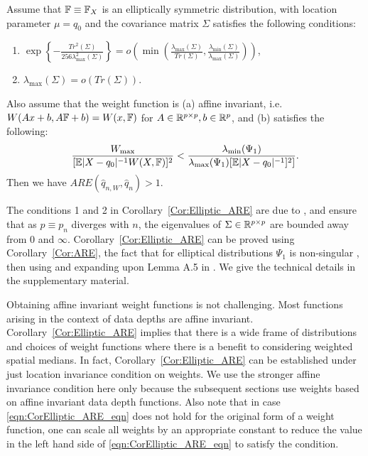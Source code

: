 \begin{Corollary}\label{Cor:Elliptic_ARE}
Assume that ${\mathbb{F}} \equiv {\mathbb{F}}_X$ is an elliptically symmetric distribution, with location parameter $\mu = q_{0}$ and the covariance matrix $\Sigma$ satisfies the following conditions:
%
\begin{enumerate}


\item $\exp \left\{ - \frac{Tr^2 (\Sigma)}{ 256 \lambda_{\max}^2 (\Sigma)} \right\} = 
o\left( \min\left( \frac{\lambda_{\max}(\Sigma) }{Tr( \Sigma)},
\frac{\lambda_{\min}(\Sigma)}{\lambda_{\max}(\Sigma)} \right) \right)$,

\item $\lambda_{\max}(\Sigma) = o( Tr(\Sigma))$.
\end{enumerate}

Also assume that the weight function is (a) affine invariant, i.e. $ W (Ax + b, A{\mathbb{F}} + b) = W (x, {\mathbb{F}})$ for $A \in {\mathbb{R}}^{p \times p}, b \in {\mathbb{R}}^p$, and (b) satisfies the following:
%
\begin{equation}\label{eqn:CorElliptic_ARE_eqn}
\frac{W_{\max}}{[ {\mathbb{E}} | X - q_0|^{-1} W(X, {\mathbb{F}})]^2 } <
\frac{\lambda_{\min} (\Psi_1)}{\lambda_{\max} (\Psi_1) [ {\mathbb{E}} | X - q_0|^{-1}]^2]}.
\end{equation}
%
Then we have $ARE( \hat q_{n,W}, \hat q_n) > 1$.
\end{Corollary}

The conditions 1 and 2 in Corollary~\ref{Cor:Elliptic_ARE} are due to \cite{ref:JASA151658_WangPengLi}, and ensure that as $p \equiv p_n$ diverges with $n$, the eigenvalues of $\Sigma \in {\mathbb{R}}^{p \times p}$ are bounded away from 0 and $\infty$. Corollary~\ref{Cor:Elliptic_ARE} can be proved using Corollary~\ref{Cor:ARE}, the fact that for elliptical distributions $\Psi_1$ is non-singular \citep{ref:SPL12765_Taskinenetal}, then using and expanding upon Lemma A.5 in \cite{ref:JASA151658_WangPengLi}. We give the technical details in the supplementary material.

Obtaining affine invariant weight functions is not challenging. Most functions arising in the context of data depths are affine invariant. Corollary~\ref{Cor:Elliptic_ARE} implies that there is a wide frame of distributions and  choices of weight functions where there is a benefit to considering weighted spatial medians. In fact, Corollary~\ref{Cor:Elliptic_ARE} can be established under just 
location invariance condition on weights. We use the stronger affine invariance condition
here only because the subsequent sections use weights based on affine invariant 
data depth functions. Also note that in case \eqref{eqn:CorElliptic_ARE_eqn} does not hold for the original form of a weight function, one can scale all weights by an appropriate constant to reduce the value in the left hand side of \eqref{eqn:CorElliptic_ARE_eqn} to satisfy the condition.

